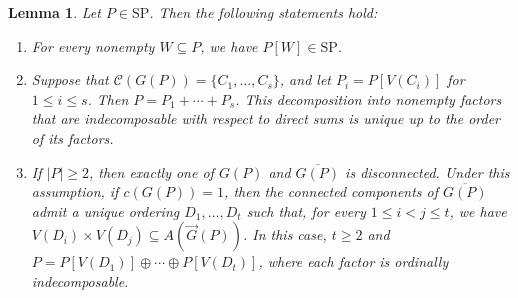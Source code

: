 \documentclass[10pt,a4paper]{amsart}
\newtheorem{lemma}[theorem]{Lemma}
\begin{document}
\begin{lemma}\label{lem:graph-decomposition}
Let $P\in\mathrm{SP}$. Then the following statements hold:
\begin{enumerate}
    \item[\textup{(i)}] For every nonempty $W\subseteq P$, we have $P[W]\in\mathrm{SP}$.
    \item[\textup{(ii)}] Suppose that $\mathcal C(G(P))=\{C_1,\ldots,C_s\}$,
    and let $P_i=P[V(C_i)]$ for $1\le i\le s$.
    Then $P=P_1+\cdots+P_s$.
    This decomposition into nonempty factors that are indecomposable
    with respect to direct sums is unique up to the order of its factors.
    \item[\textup{(iii)}]
    If $|P|\ge2$, then exactly one of $G(P)$ and $\overline{G(P)}$ is disconnected.
    Under this assumption, if $c(G(P))=1$, then the connected
    components of $\overline{G(P)}$ admit a unique ordering
    $D_1,\ldots,D_t$ such that, for every $1\le i<j\le t$,
    we have $V(D_i)\times V(D_j)\subseteq A(\vec G(P))$.
    In this case, $t\ge2$ and $P=P[V(D_1)]\oplus\cdots\oplus P[V(D_t)]$,
    where each factor is ordinally indecomposable.
\end{enumerate}
\end{lemma}
\end{document}
